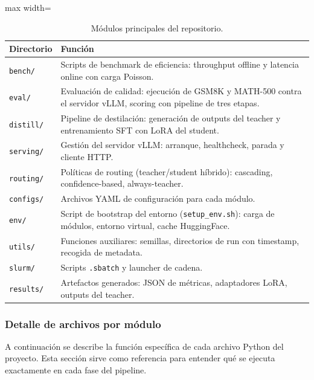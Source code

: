 \documentclass[11pt,a4paper]{article}
\begin{document}
\begin{table}[H]
\centering
\caption{M\'odulos principales del repositorio.}
\label{tab:modules}
\begin{adjustbox}{max width=\textwidth}
\begin{tabular}{@{}lp{10cm}@{}}
\toprule
\textbf{Directorio} & \textbf{Funci\'on} \\
\midrule
\texttt{bench/}    & Scripts de benchmark de eficiencia: throughput offline
                     y latencia online con carga Poisson. \\
\texttt{eval/}     & Evaluaci\'on de calidad: ejecuci\'on de GSM8K y
                     MATH-500 contra el servidor vLLM, scoring con
                     pipeline de tres etapas. \\
\texttt{distill/}  & Pipeline de destilaci\'on: generaci\'on de outputs
                     del teacher y entrenamiento SFT con LoRA del student. \\
\texttt{serving/}  & Gesti\'on del servidor vLLM: arranque, healthcheck,
                     parada y cliente HTTP. \\
\texttt{routing/}  & Pol\'iticas de routing (teacher/student h\'ibrido):
                     cascading, confidence-based, always-teacher. \\
\texttt{configs/}  & Archivos YAML de configuraci\'on para cada m\'odulo. \\
\texttt{env/}      & Script de bootstrap del entorno (\texttt{setup\_env.sh}):
                     carga de m\'odulos, entorno virtual, cache HuggingFace. \\
\texttt{utils/}    & Funciones auxiliares: semillas, directorios de run
                     con timestamp, recogida de metadata. \\
\texttt{slurm/}    & Scripts \texttt{.sbatch} y launcher de cadena. \\
\texttt{results/}  & Artefactos generados: JSON de m\'etricas, adaptadores
                     LoRA, outputs del teacher. \\
\bottomrule
\end{tabular}
\end{adjustbox}
\end{table}

\subsubsection{Detalle de archivos por m\'odulo}

A continuaci\'on se describe la funci\'on espec\'ifica de cada archivo
Python del proyecto. Esta secci\'on sirve como referencia para entender
qu\'e se ejecuta exactamente en cada fase del pipeline.
\end{document}
